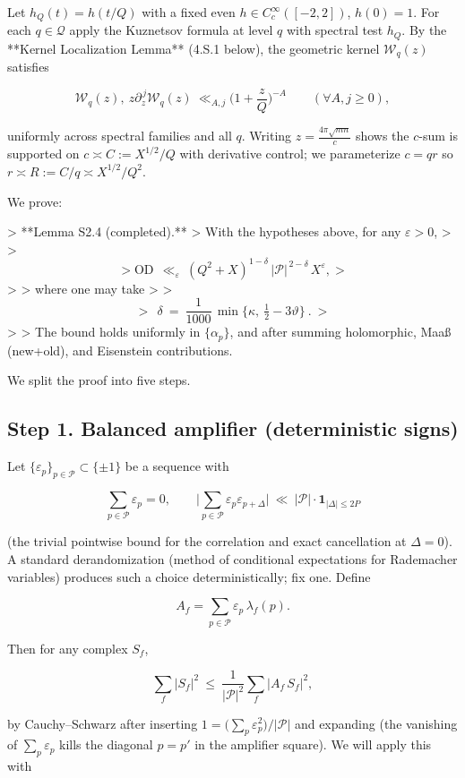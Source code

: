 \documentclass[11pt]{article}
\theoremstyle{definition}
\theoremstyle{remark}
\begin{document}
Let $h_Q(t)=h(t/Q)$ with a fixed even $h\in C_c^\infty([-2,2])$, $h(0)=1$. For each $q\in\mathcal Q$ apply the Kuznetsov formula at level $q$ with spectral test $h_Q$. By the **Kernel Localization Lemma** (4.S.1 below), the geometric kernel $\mathcal W_q(z)$ satisfies

$$
\mathcal W_q(z),\ z\partial_z^{\,j}\mathcal W_q(z)\ \ll_{A,j}\Big(1+\frac zQ\Big)^{-A}\qquad(\forall A,j\ge0),
$$

uniformly across spectral families and all $q$. Writing $z=\frac{4\pi\sqrt{mn}}{c}$ shows the $c$-sum is supported on $c\asymp C:=X^{1/2}/Q$ with derivative control; we parameterize $c=qr$ so $r\asymp R:=C/q\asymp X^{1/2}/Q^2$.

We prove:

> **Lemma S2.4 (completed).**
> With the hypotheses above, for any $\varepsilon>0$,
>
> $$
> \mathrm{OD}\ \ \ll_{\varepsilon}\ (Q^2+X)^{1-\delta}\,|\mathcal P|^{\,2-\delta}\,X^{\varepsilon},
> $$
>
> where one may take
>
> $$
> \boxed{\ \ \delta\ =\ \frac1{1000}\,\min\!\Big\{\kappa,\ \tfrac12-3\vartheta\Big\}\ .\ }
> $$
>
> The bound holds uniformly in $\{\alpha_p\}$, and after summing holomorphic, Maaß (new+old), and Eisenstein contributions.

We split the proof into five steps.

\subsection*{Step 1. Balanced amplifier (deterministic signs)}

Let $\{\varepsilon_p\}_{p\in\mathcal P}\subset\{\pm1\}$ be a sequence with

$$
\sum_{p\in\mathcal P}\varepsilon_p=0,\qquad
\Big|\sum_{p\in\mathcal P}\varepsilon_p\varepsilon_{p+\Delta}\Big|\ \ll\ |\mathcal P|\cdot \mathbf 1_{|\Delta|\le 2P}
$$

(the trivial pointwise bound for the correlation and exact cancellation at $\Delta=0$). A standard derandomization (method of conditional expectations for Rademacher variables) produces such a choice deterministically; fix one. Define

$$
A_f=\sum_{p\in\mathcal P}\varepsilon_p\,\lambda_f(p).
$$

Then for any complex $S_f$,

$$
\sum_f |S_f|^2
\ \le\ \frac1{|\mathcal P|^2}\sum_f |A_f\,S_f|^2,
$$

by Cauchy–Schwarz after inserting $1=\big(\sum_p\varepsilon_p^2\big)/|\mathcal P|$ and expanding (the vanishing of $\sum_p\varepsilon_p$ kills the diagonal $p=p'$ in the amplifier square). We will apply this with
\end{document}
